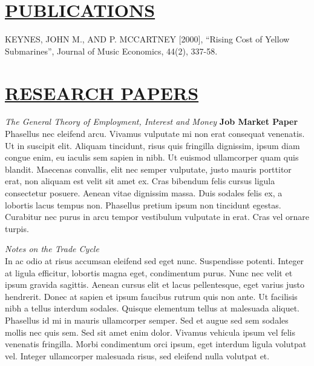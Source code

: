 \documentclass{res} %
\begin{document}
\begin{resume}
\section{\scshape \underline{PUBLICATIONS}} 
\vspace{6pt}%
\noindent KEYNES, JOHN M., AND P. MCCARTNEY [2000], “Rising Cost of Yellow Submarines”, Journal of Music Economics, 44(2), 337-58.\par

\vspace{-.2cm}
\section{\scshape \underline{RESEARCH PAPERS}} 
\vspace{6pt}

\noindent \emph{ The General Theory of Employment, Interest and Money  }\hfill {\bf Job Market Paper}  \\
Phasellus nec eleifend arcu. Vivamus vulputate mi non erat consequat venenatis. Ut in suscipit elit. Aliquam tincidunt, risus quis fringilla dignissim, ipsum diam congue enim, eu iaculis sem sapien in nibh. Ut euismod ullamcorper quam quis blandit. Maecenas convallis, elit nec semper vulputate, justo mauris porttitor erat, non aliquam est velit sit amet ex. Cras bibendum felis cursus ligula consectetur posuere. Aenean vitae dignissim massa. Duis sodales felis ex, a lobortis lacus tempus non. Phasellus pretium ipsum non tincidunt egestas. Curabitur nec purus in arcu tempor vestibulum vulputate in erat. Cras vel ornare turpis. \par

\vspace{6pt} %

\noindent \emph{Notes on the Trade Cycle}      \hfill   \\
In ac odio at risus accumsan eleifend sed eget nunc. Suspendisse potenti. Integer at ligula efficitur, lobortis magna eget, condimentum purus. Nunc nec velit et ipsum gravida sagittis. Aenean cursus elit et lacus pellentesque, eget varius justo hendrerit. Donec at sapien et ipsum faucibus rutrum quis non ante. Ut facilisis nibh a tellus interdum sodales. Quisque elementum tellus at malesuada aliquet. Phasellus id mi in mauris ullamcorper semper. Sed et augue sed sem sodales mollis nec quis sem. Sed sit amet enim dolor. Vivamus vehicula ipsum vel felis venenatis fringilla. Morbi condimentum orci ipsum, eget interdum ligula volutpat vel. Integer ullamcorper malesuada risus, sed eleifend nulla volutpat et.
\vspace{10pt} %


\end{resume}
\end{document}
